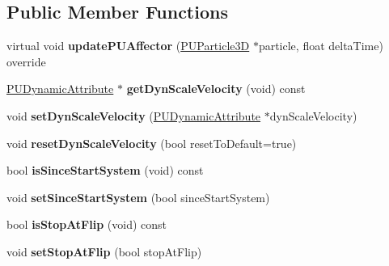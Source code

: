 \subsection*{Public Member Functions}
\begin{DoxyCompactItemize}
\item 
\mbox{\label{classPUScaleVelocityAffector_af7f684f0e27fa5e88158d7a6e2668790}} 
virtual void {\bfseries update\+P\+U\+Affector} (\hyperlink{structPUParticle3D}{P\+U\+Particle3D} $\ast$particle, float delta\+Time) override
\item 
\mbox{\label{classPUScaleVelocityAffector_a0f1e22cef8b3e15051d324fa2bd20e11}} 
\hyperlink{classPUDynamicAttribute}{P\+U\+Dynamic\+Attribute} $\ast$ {\bfseries get\+Dyn\+Scale\+Velocity} (void) const
\item 
\mbox{\label{classPUScaleVelocityAffector_aaabc878632bc8f8e50c2b6abc604b0a5}} 
void {\bfseries set\+Dyn\+Scale\+Velocity} (\hyperlink{classPUDynamicAttribute}{P\+U\+Dynamic\+Attribute} $\ast$dyn\+Scale\+Velocity)
\item 
\mbox{\label{classPUScaleVelocityAffector_a16c22d74900ea05f8a8985d331d352da}} 
void {\bfseries reset\+Dyn\+Scale\+Velocity} (bool reset\+To\+Default=true)
\item 
\mbox{\label{classPUScaleVelocityAffector_ac21d9b8d912d3a645237541abf429162}} 
bool {\bfseries is\+Since\+Start\+System} (void) const
\item 
\mbox{\label{classPUScaleVelocityAffector_a2ba369ab2f597f70789d3c7db18bbd30}} 
void {\bfseries set\+Since\+Start\+System} (bool since\+Start\+System)
\item 
\mbox{\label{classPUScaleVelocityAffector_abd18792dc888cb5f74aa6248adc13334}} 
bool {\bfseries is\+Stop\+At\+Flip} (void) const
\item 
\mbox{\label{classPUScaleVelocityAffector_ac56c91316a6f09a60b58f3dbab6b78cb}} 
void {\bfseries set\+Stop\+At\+Flip} (bool stop\+At\+Flip)
\item 

\end{DoxyCompactItemize}
